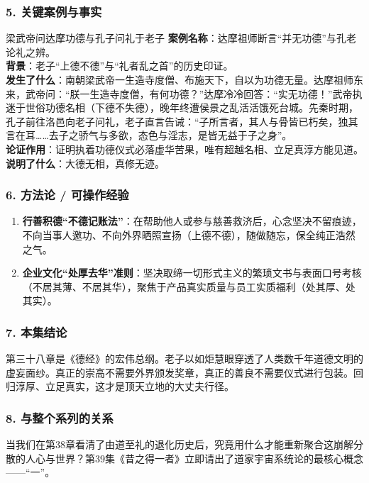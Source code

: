 \subsubsection{5. 关键案例与事实}
\begin{CaseBox}{梁武帝问达摩功德与孔子问礼于老子}
\textbf{案例名称}：达摩祖师断言“并无功德”与孔老论礼之辨。\\
\textbf{背景}：老子“上德不德”与“礼者乱之首”的历史印证。\\
\textbf{发生了什么}：南朝梁武帝一生造寺度僧、布施天下，自以为功德无量。达摩祖师东来，武帝问：“朕一生造寺度僧，有何功德？”达摩冷冷回答：“实无功德！”武帝执迷于世俗功德名相（下德不失德），晚年终遭侯景之乱活活饿死台城。先秦时期，孔子前往洛邑向老子问礼，老子直言告诫：“子所言者，其人与骨皆已朽矣，独其言在耳……去子之骄气与多欲，态色与淫志，是皆无益于子之身”。\\
\textbf{论证作用}：证明执着功德仪式必落虚华苦果，唯有超越名相、立足真淳方能见道。\\
\textbf{说明了什么}：大德无相，真修无迹。
\end{CaseBox}

\subsubsection{6. 方法论 / 可操作经验}
\begin{enumerate}
    \item \textbf{行善积德“不德记账法”}：在帮助他人或参与慈善救济后，心念坚决不留痕迹，不向当事人邀功、不向外界晒照宣扬（上德不德），随做随忘，保全纯正浩然之气。
    \item \textbf{企业文化“处厚去华”准则}：坚决取缔一切形式主义的繁琐文书与表面口号考核（不居其薄、不居其华），聚焦于产品真实质量与员工实质福利（处其厚、处其实）。
\end{enumerate}

\subsubsection{7. 本集结论}
第三十八章是《德经》的宏伟总纲。老子以如炬慧眼穿透了人类数千年道德文明的虚妄面纱。真正的崇高不需要外界颁发奖章，真正的善良不需要仪式进行包装。回归淳厚、立足真实，这才是顶天立地的大丈夫行径。

\subsubsection{8. 与整个系列的关系}
当我们在第38章看清了由道至礼的退化历史后，究竟用什么才能重新聚合这崩解分散的人心与世界？第39集《昔之得一者》立即请出了道家宇宙系统论的最核心概念——“一”。


